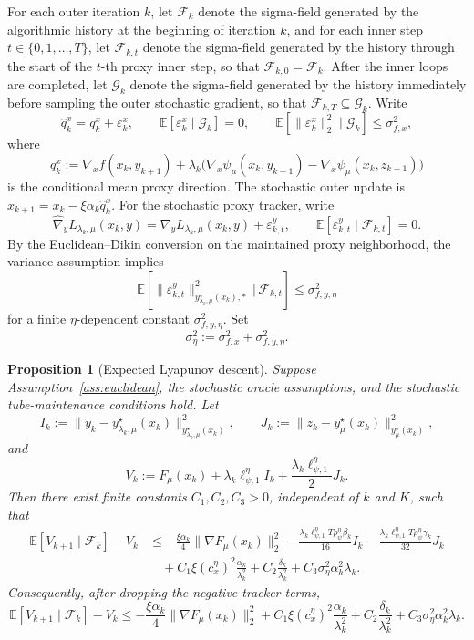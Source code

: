 \documentclass{article}
\newtheorem{proposition}{Proposition}
\begin{document}
For each outer iteration \(k\), let \(\mathcal F_k\) denote the sigma-field
generated by the algorithmic history at the beginning of iteration \(k\), and
for each inner step \(t\in\{0,1,\ldots,T\}\), let \(\mathcal F_{k,t}\) denote
the sigma-field generated by the history through the start of the \(t\)-th
proxy inner step, so that \(\mathcal F_{k,0}=\mathcal F_k\). After the inner
loops are completed, let \(\mathcal G_k\) denote the sigma-field generated by
the history immediately before sampling the outer stochastic gradient, so that
\(\mathcal F_{k,T}\subseteq \mathcal G_k\). Write
\[
\widehat q_k^x = q_k^x+\varepsilon_k^x,
\qquad
\mathbb E[\varepsilon_k^x\mid \mathcal G_k]=0,
\qquad
\mathbb E[\|\varepsilon_k^x\|_2^2\mid \mathcal G_k]\le \sigma_{f,x}^2,
\]
where
\[
q_k^x
:=
\nabla_x f(x_k,y_{k+1})
+\lambda_k\bigl(\nabla_x\psi_\mu(x_k,y_{k+1})-\nabla_x\psi_\mu(x_k,z_{k+1})\bigr)
\]
is the conditional mean proxy direction. The stochastic outer update is
\(x_{k+1}=x_k-\xi\alpha_k\widehat q_k^x\). For the stochastic proxy tracker, write
\[
\widehat \nabla_y L_{\lambda_k,\mu}(x_k,y)
=
\nabla_y L_{\lambda_k,\mu}(x_k,y)+\varepsilon_{k,t}^y,
\qquad
\mathbb E[\varepsilon_{k,t}^y\mid \mathcal F_{k,t}]=0.
\]
By the Euclidean--Dikin conversion on the maintained proxy neighborhood, the
variance assumption implies
\[
\mathbb E\!\left[\|\varepsilon_{k,t}^y\|_{y_{\lambda_k,\mu}^\star(x_k),*}^2\,\Big|\,\mathcal F_{k,t}\right]
\le
\sigma_{f,y,\eta}^2
\]
for a finite \(\eta\)-dependent constant \(\sigma_{f,y,\eta}^2\). Set
\[
\sigma_\eta^2 := \sigma_{f,x}^2+\sigma_{f,y,\eta}^2 .
\]
\begin{proposition}[Expected Lyapunov descent]
\label{prop:stoch_lyapunov_descent}
Suppose Assumption~\ref{ass:euclidean}, the stochastic oracle assumptions, and the stochastic
tube-maintenance conditions hold. Let
\[
I_k
:=
\big\|y_k-y_{\lambda_k,\mu}^\star(x_k)\big\|_{y_{\lambda_k,\mu}^\star(x_k)}^2,
\qquad
J_k
:=
\big\|z_k-y_\mu^\star(x_k)\big\|_{y_\mu^\star(x_k)}^2,
\]
and
\[
V_k
:=
F_\mu(x_k)
+
\lambda_k\ell_{\psi,1}^\eta I_k
+
\frac{\lambda_k\ell_{\psi,1}^\eta}{2}J_k .
\]
Then there exist finite constants \(C_1,C_2,C_3>0\), independent of \(k\) and \(K\), such that
\begin{align}
\mathbb E[V_{k+1}\mid \mathcal F_k]-V_k
&\le
-\frac{\xi\alpha_k}{4}\|\nabla F_\mu(x_k)\|_2^2
-\frac{\lambda_k\ell_{\psi,1}^\eta T\rho_\psi^\eta\beta_k}{16}I_k
-\frac{\lambda_k\ell_{\psi,1}^\eta T\rho_\psi^\eta\gamma_k}{32}J_k
\nonumber\\
&\quad
+
C_1\xi(c_x^\eta)^2\frac{\alpha_k}{\lambda_k^2}
+
C_2\frac{\delta_k}{\lambda_k^2}
+
C_3\sigma_\eta^2\alpha_k^2\lambda_k .
\label{eq:stoch_lyap_descent}
\end{align}
Consequently, after dropping the negative tracker terms,
\begin{equation}
\label{eq:stoch_lyap_descent_simplified}
\mathbb E[V_{k+1}\mid \mathcal F_k]-V_k
\le
-\frac{\xi\alpha_k}{4}\|\nabla F_\mu(x_k)\|_2^2
+
C_1\xi(c_x^\eta)^2\frac{\alpha_k}{\lambda_k^2}
+
C_2\frac{\delta_k}{\lambda_k^2}
+
C_3\sigma_\eta^2\alpha_k^2\lambda_k .
\end{equation}
\end{proposition}
\end{document}
